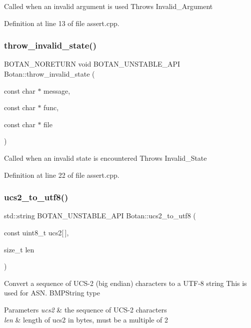 Called when an invalid argument is used Throws Invalid\+\_\+\+Argument 

Definition at line 13 of file assert.\+cpp.

\mbox{\label{namespace_botan_ad46752d75e4f165d48d1ab2c5c33033b}} 
\subsubsection{\texorpdfstring{throw\+\_\+invalid\+\_\+state()}{throw\_invalid\_state()}}
{\footnotesize\ttfamily B\+O\+T\+A\+N\+\_\+\+N\+O\+R\+E\+T\+U\+RN void B\+O\+T\+A\+N\+\_\+\+U\+N\+S\+T\+A\+B\+L\+E\+\_\+\+A\+PI Botan\+::throw\+\_\+invalid\+\_\+state (\begin{DoxyParamCaption}\item[{const char $\ast$}]{message,  }\item[{const char $\ast$}]{func,  }\item[{const char $\ast$}]{file }\end{DoxyParamCaption})}

Called when an invalid state is encountered Throws Invalid\+\_\+\+State 

Definition at line 22 of file assert.\+cpp.

\mbox{\label{namespace_botan_a2d7ee67f502279fc24a01b42c5451c3c}} 
\subsubsection{\texorpdfstring{ucs2\+\_\+to\+\_\+utf8()}{ucs2\_to\_utf8()}}
{\footnotesize\ttfamily std\+::string B\+O\+T\+A\+N\+\_\+\+U\+N\+S\+T\+A\+B\+L\+E\+\_\+\+A\+PI Botan\+::ucs2\+\_\+to\+\_\+utf8 (\begin{DoxyParamCaption}\item[{const uint8\+\_\+t}]{ucs2\mbox{[}$\,$\mbox{]},  }\item[{size\+\_\+t}]{len }\end{DoxyParamCaption})}

Convert a sequence of U\+C\+S-\/2 (big endian) characters to a U\+T\+F-\/8 string This is used for A\+S\+N. B\+M\+P\+String type 
\begin{DoxyParams}{Parameters}
{\em ucs2} & the sequence of U\+C\+S-\/2 characters \\
\hline
{\em len} & length of ucs2 in bytes, must be a multiple of 2 \\
\hline
\end{DoxyParams}


